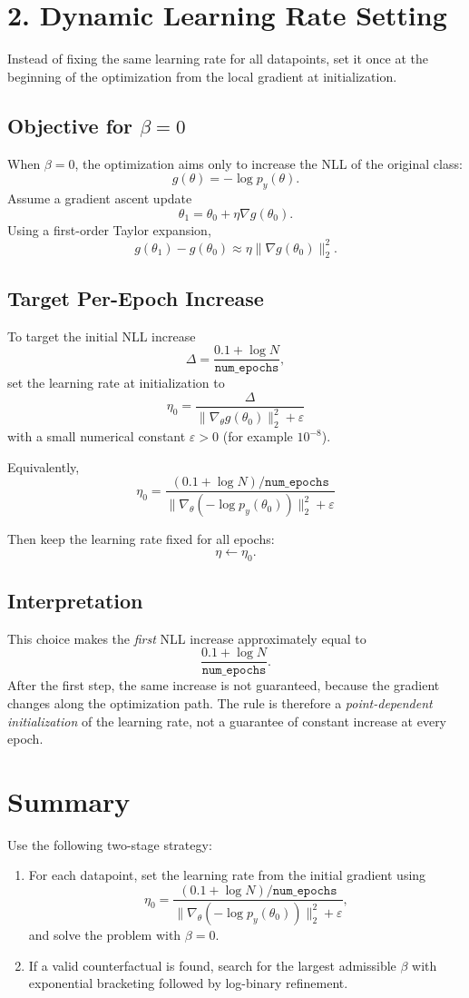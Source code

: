 \documentclass[11pt]{article}
\begin{document}
\section{2. Dynamic Learning Rate Setting}
Instead of fixing the same learning rate for all datapoints, set it once at the beginning of the optimization from the local gradient at initialization.

\subsection*{Objective for $\beta = 0$}
When $\beta = 0$, the optimization aims only to increase the NLL of the original class:
\[
g(\theta) = -\log p_y(\theta).
\]
Assume a gradient ascent update
\[
\theta_{1} = \theta_0 + \eta \nabla g(\theta_0).
\]
Using a first-order Taylor expansion,
\[
g(\theta_1) - g(\theta_0) \approx \eta \|\nabla g(\theta_0)\|_2^2.
\]

\subsection*{Target Per-Epoch Increase}
To target the initial NLL increase
\[
\Delta = \frac{0.1 + \log N}{\texttt{num\_epochs}},
\]
set the learning rate at initialization to
\[
\boxed{
\eta_0 = \frac{\Delta}{\|\nabla_\theta g(\theta_0)\|_2^2 + \varepsilon}
}
\]
with a small numerical constant $\varepsilon > 0$ (for example $10^{-8}$).

Equivalently,
\[
\boxed{
\eta_0 = 
\frac{(0.1 + \log N)/\texttt{num\_epochs}}
{\|\nabla_\theta(-\log p_y(\theta_0))\|_2^2 + \varepsilon}
}
\]

Then keep the learning rate fixed for all epochs:
\[
\eta \leftarrow \eta_0.
\]

\subsection*{Interpretation}
This choice makes the \emph{first} NLL increase approximately equal to
\[
\frac{0.1 + \log N}{\texttt{num\_epochs}}.
\]
After the first step, the same increase is not guaranteed, because the gradient changes along the optimization path. The rule is therefore a \emph{point-dependent initialization} of the learning rate, not a guarantee of constant increase at every epoch.

\section{Summary}
Use the following two-stage strategy:
\begin{enumerate}
    \item For each datapoint, set the learning rate from the initial gradient using
    \[
    \eta_0 = \frac{(0.1 + \log N)/\texttt{num\_epochs}}
    {\|\nabla_\theta(-\log p_y(\theta_0))\|_2^2 + \varepsilon},
    \]
    and solve the problem with $\beta = 0$.
    \item If a valid counterfactual is found, search for the largest admissible $\beta$ with exponential bracketing followed by log-binary refinement.
\end{enumerate}
\end{document}
